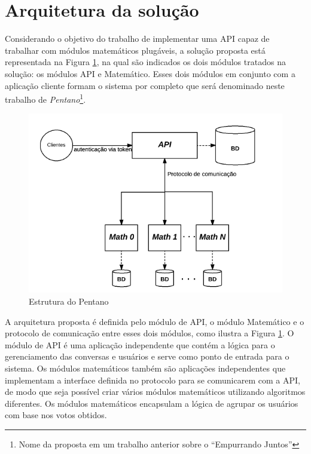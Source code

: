     

\section{Arquitetura da solução} \label{architecture}
    
    Considerando o objetivo do trabalho de implementar uma API capaz de trabalhar com 
    módulos matemáticos plugáveis, a solução proposta está representada na Figura \ref{fig:pentano}, 
    na qual são indicados os dois módulos tratados na solução: os módulos API e Matemático. Esses
    dois módulos em conjunto com a aplicação cliente formam o sistema por completo que será denominado neste trabalho
    de \textit{Pentano}\footnote{Nome da proposta em um trabalho anterior sobre o ``Empurrando Juntos''}.
    
    \begin{figure}[h!]
    \centering
    \includegraphics[scale=0.7]{figuras/esquema_pentano.png}
    \caption{Estrutura do Pentano}
    \label{fig:pentano}
    \end{figure}
    
    A arquitetura proposta é definida pelo módulo de API, o módulo Matemático
    e o protocolo de comunicação entre esses dois módulos, como ilustra a Figura \ref{fig:pentano}. O módulo de 
    API é uma aplicação independente que contém a lógica para o gerenciamento das conversas e usuários e
    serve como ponto de entrada para o sistema. Os módulos matemáticos também são aplicações independentes que implementam a 
    interface definida no protocolo
    para se comunicarem com a API, de modo que seja possível criar vários módulos matemáticos utilizando algoritmos diferentes.
    Os módulos matemáticos encapsulam a lógica de agrupar os usuários com base nos votos obtidos.
    
